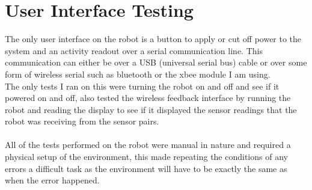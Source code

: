 \section{User Interface Testing}
The only user interface on the robot is a button to apply or cut off power to the system and an activity readout over a serial communication line.  This communication can either be over a USB (universal serial bus) cable or over some form of wireless serial such as bluetooth or the xbee module I am using.
\\The only tests I ran on this were turning the robot on and off and see if it powered on and off, also tested the wireless feedback interface by running the robot and reading the display to see if it displayed the sensor readings that the robot was receiving from the sensor pairs.
\\\\All of the tests performed on the robot were manual in nature and required a physical setup of the environment, this made repeating the conditions of any errors a difficult task as the environment will have to be exactly the same as when the error happened.
